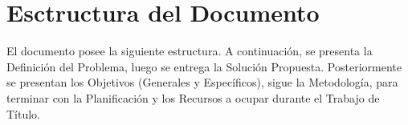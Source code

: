 \section{Esctructura del Documento}

El documento posee la siguiente estructura. A continuación, se presenta la Definición del Problema, luego se entrega la Solución Propuesta. Posteriormente se presentan los Objetivos (Generales y Específicos), sigue la Metodología, para terminar con la Planificación y los Recursos a ocupar durante el Trabajo de Título.